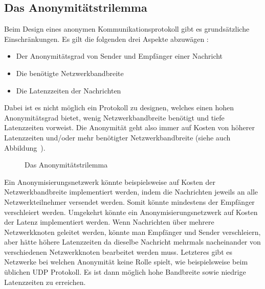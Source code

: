 \subsection{Das Anonymitätstrilemma}\label{sec:anonymitytrilemma}

Beim Design eines anonymen Kommunikationsprotokoll gibt es grundsätzliche Einschränkungen. Es gilt die folgenden drei Aspekte abzuwägen :

\begin{itemize}
    \item Der Anonymitätsgrad von Sender und Empfänger einer Nachricht
    \item Die benötigte Netzwerkbandbreite
    \item Die Latenzzeiten der Nachrichten
\end{itemize}


Dabei ist es nicht möglich ein Protokoll zu designen, welches einen hohen Anonymitätsgrad bietet, wenig Netzwerkbandbreite benötigt und tiefe Latenzzeiten vorweist.
Die Anonymität geht also immer auf Kosten von höherer Latenzzeiten und/oder mehr benötigter Netzwerkbandbreite (siehe auch Abbildung~).

\begin{figure}[H]
    \centering
    \caption{Das Anonymitätstrilemma}\label{fig:anonimitytrilemma}
\end{figure}

Ein Anonymisierungsnetzwerk könnte beispielsweise auf Kosten der Netzwerkbandbreite implementiert werden, indem die Nachrichten jeweils an alle Netzwerkteilnehmer versendet werden.
Somit könnte mindestens der Empfänger verschleiert werden.
Umgekehrt könnte ein Anonymisierungsnetzwerk auf Kosten der Latenz implementiert werden. Wenn Nachrichten über mehrere Netzwerkknoten geleitet werden, könnte man Empfänger und Sender verschleiern, aber hätte höhere Latenzzeiten da dieselbe Nachricht mehrmals nacheinander von verschiedenen Netzwerkknoten bearbeitet werden muss.
Letzteres gibt es Netzwerke bei welchen Anonymität keine Rolle spielt, wie beispielsweise beim üblichen UDP Protokoll. Es ist dann möglich hohe Bandbreite sowie niedrige Latenzzeiten zu erreichen.

